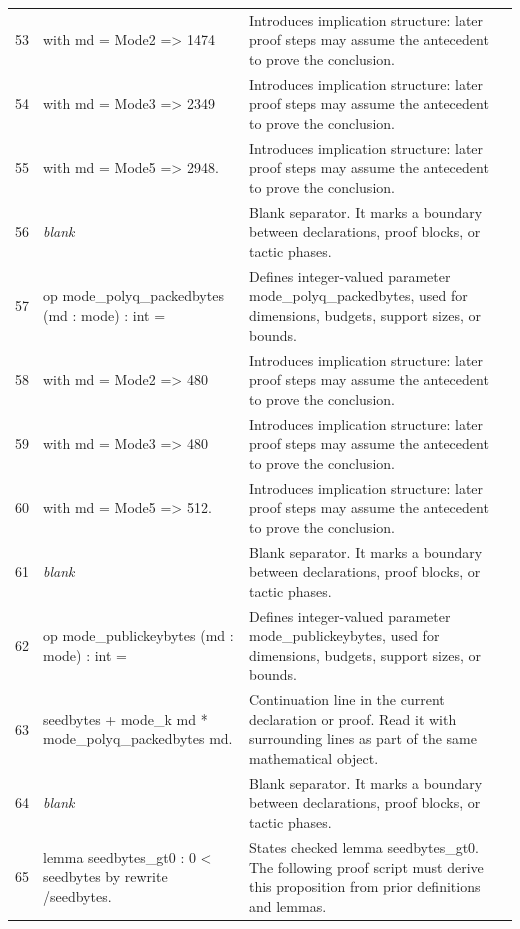 \documentclass[10pt]{article}
\begin{document}
\begin{longtable}{r L{0.53\textwidth} L{0.37\textwidth}}
53 & {\ttfamily\scriptsize   with md = Mode2 => 1474} & Introduces implication structure: later proof steps may assume the antecedent to prove the conclusion. \\
54 & {\ttfamily\scriptsize   with md = Mode3 => 2349} & Introduces implication structure: later proof steps may assume the antecedent to prove the conclusion. \\
55 & {\ttfamily\scriptsize   with md = Mode5 => 2948.} & Introduces implication structure: later proof steps may assume the antecedent to prove the conclusion. \\
56 & {\ttfamily\scriptsize \emph{blank}} & Blank separator.  It marks a boundary between declarations, proof blocks, or tactic phases. \\
57 & {\ttfamily\scriptsize op mode\_polyq\_packedbytes (md : mode) : int =} & Defines integer-valued parameter mode\_polyq\_packedbytes, used for dimensions, budgets, support sizes, or bounds. \\
58 & {\ttfamily\scriptsize   with md = Mode2 => 480} & Introduces implication structure: later proof steps may assume the antecedent to prove the conclusion. \\
59 & {\ttfamily\scriptsize   with md = Mode3 => 480} & Introduces implication structure: later proof steps may assume the antecedent to prove the conclusion. \\
60 & {\ttfamily\scriptsize   with md = Mode5 => 512.} & Introduces implication structure: later proof steps may assume the antecedent to prove the conclusion. \\
61 & {\ttfamily\scriptsize \emph{blank}} & Blank separator.  It marks a boundary between declarations, proof blocks, or tactic phases. \\
62 & {\ttfamily\scriptsize op mode\_publickeybytes (md : mode) : int =} & Defines integer-valued parameter mode\_publickeybytes, used for dimensions, budgets, support sizes, or bounds. \\
63 & {\ttfamily\scriptsize   seedbytes + mode\_k md * mode\_polyq\_packedbytes md.} & Continuation line in the current declaration or proof.  Read it with surrounding lines as part of the same mathematical object. \\
64 & {\ttfamily\scriptsize \emph{blank}} & Blank separator.  It marks a boundary between declarations, proof blocks, or tactic phases. \\
65 & {\ttfamily\scriptsize lemma seedbytes\_gt0 : 0 < seedbytes by rewrite /seedbytes.} & States checked lemma seedbytes\_gt0.  The following proof script must derive this proposition from prior definitions and lemmas. \\

\end{longtable}
\end{document}
